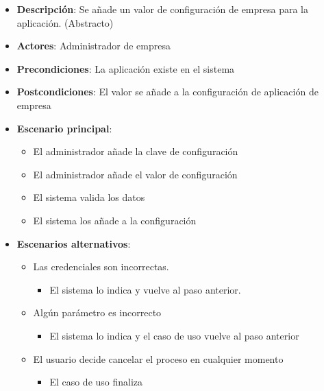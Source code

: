 \documentclass[12pt,a4paperpaper,]{report}
\providecommand{\tightlist}{%
  \setlength{\itemsep}{0pt}\setlength{\parskip}{0pt}}
\begin{document}
\begin{itemize}
\tightlist
\item
  \textbf{Descripción}: Se añade un valor de configuración de empresa
  para la aplicación. (Abstracto)
\item
  \textbf{Actores}: Administrador de empresa
\item
  \textbf{Precondiciones}: La aplicación existe en el sistema
\item
  \textbf{Postcondiciones}: El valor se añade a la configuración de
  aplicación de empresa
\item
  \textbf{Escenario principal}:

  \begin{itemize}
  \tightlist
  \item
    El administrador añade la clave de configuración
  \item
    El administrador añade el valor de configuración
  \item
    El sistema valida los datos
  \item
    El sistema los añade a la configuración
  \end{itemize}
\item
  \textbf{Escenarios alternativos}:

  \begin{itemize}
  \tightlist
  \item
    Las credenciales son incorrectas.

    \begin{itemize}
    \tightlist
    \item
      El sistema lo indica y vuelve al paso anterior.
    \end{itemize}
  \item
    Algún parámetro es incorrecto

    \begin{itemize}
    \tightlist
    \item
      El sistema lo indica y el caso de uso vuelve al paso anterior
    \end{itemize}
  \item
    El usuario decide cancelar el proceso en cualquier momento

    \begin{itemize}
    \tightlist
    \item
      El caso de uso finaliza
    \end{itemize}
  \end{itemize}
\end{itemize}
\end{document}
